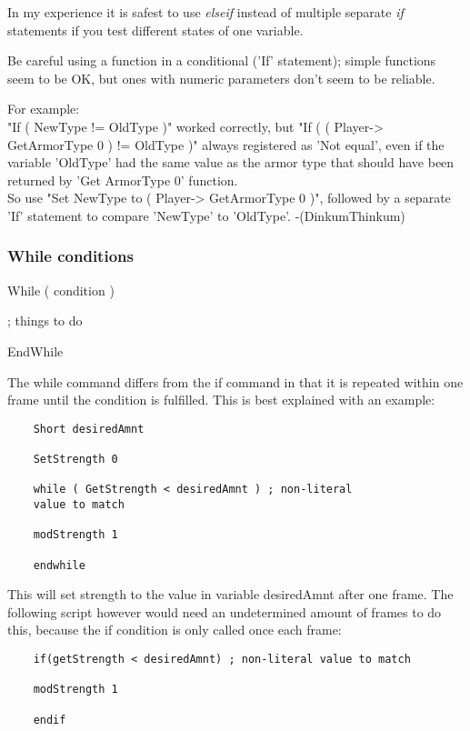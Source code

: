 In my experience it is safest to use \emph{elseif} instead of multiple
separate \emph{if} statements if you test different states of one
variable.

Be careful using a function in a conditional ('If' statement); simple
functions seem to be OK, but ones with numeric parameters don't seem to
be reliable.

For example:\\
"If ( NewType != OldType )" worked correctly, but "If ( (
Player-> GetArmorType 0 ) != OldType )" always registered as
'Not equal', even if the variable 'OldType' had the same value as the
armor type that should have been returned by 'Get ArmorType 0'
function.\\
So use "Set NewType to ( Player-> GetArmorType 0 )", followed
by a separate 'If' statement to compare 'NewType' to 'OldType'.
-(DinkumThinkum)

\hypertarget{while-conditions}{%
\subsubsection{While conditions}\label{while-conditions}}

	While ( condition )
	
	; things to do
	
	EndWhile

The while command differs from the if command in that it is repeated
within one frame until the condition is fulfilled. This is best
explained with an example:

\begin{lstlisting}
	Short desiredAmnt
	
	SetStrength 0
	
	while ( GetStrength < desiredAmnt ) ; non-literal
	value to match
	
	modStrength 1
	
	endwhile
\end{lstlisting}

This will set strength to the value in variable desiredAmnt after one
frame. The following script however would need an undetermined amount of
frames to do this, because the if condition is only called once each
frame:

\begin{lstlisting}
	if(getStrength < desiredAmnt) ; non-literal value to match
	
	modStrength 1
	
	endif
\end{lstlisting}

